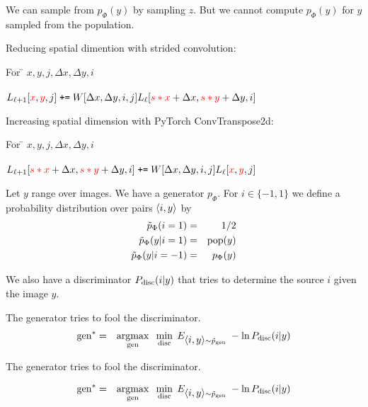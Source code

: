 {\bigskip
We can sample from $p_\Phi(y)$ by sampling $z$.  But we cannot compute $p_\Phi(y)$ for $y$ sampled from the population.

 
Reducing spatial dimention with strided convolution:
\begin{tabbing}
For \= $x,y,j,\Delta x,\Delta y, i$ \\
\\
\>$L_{{\ell+1}}[{\color{red}x},{\color{red}y},j]\; \mbox{\tt +=} \;W[\Delta x, \Delta y, i, j] L_{{\ell}}[{\color{red} s*x} + \Delta x, {\color{red} s*y} + \Delta y, i]$
\end{tabbing}

\vfill
Increasing spatial dimension with PyTorch ConvTranspose2d:
\begin{tabbing}
For \= $x,y,j,\Delta x,\Delta y, i$ \\
\\
\>$L_{{\ell+1}}[{\color{red} s*x} + \Delta x, {\color{red} s*y} + \Delta y, i]\; \mbox{\tt +=} \;W[\Delta x, \Delta y, i, j]L_\ell[{\color{red}x},{\color{red}y},j]$
\end{tabbing}


Let $y$ range over images.  We have a generator $p_\Phi$. For $i \in \{-1,1\}$ we define a probability distribution over pairs
${\mbox{$\langle i,y\rangle$}}$ by
\begin{eqnarray*}
\tilde{p}_\Phi(i = 1) & = & 1/2 \\
\tilde{p}_\Phi(y|i=1) & =&  \mathrm{pop}(y) \\
\tilde{p}_\Phi(y|i=-1) & = & p_\Phi(y)
\end{eqnarray*}

\vfill
We also have a discriminator $P_{\mathrm{disc}}(i|y)$ that tries to determine the source $i$ given the image $y$.

\vfill
The generator tries to fool the discriminator.
\begin{eqnarray*}
        \mathrm{gen}^* & = & \operatorname*{argmax}_{\mathrm{gen}}\;\;\min_{\mathrm{disc}}\;E_{{\mbox{$\langle i,y\rangle$}} \sim \tilde{p}_{\mathrm{gen}}}\;-\ln P_{\mathrm{disc}}(i|y)
\end{eqnarray*}


The generator tries to fool the discriminator.

\vfill
\begin{eqnarray*}
\mathrm{gen}^* & = & \operatorname*{argmax}_{\mathrm{gen}}\;\;\min_{\mathrm{disc}}\;E_{{\mbox{$\langle i,y\rangle$}} \sim \tilde{p}_{\mathrm{gen}}}\;-\ln P_{\mathrm{disc}}(i|y)
\end{eqnarray*}

}
